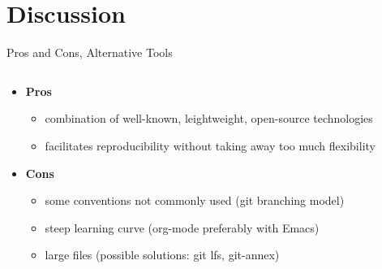 \documentclass[10pt,aspectratio=169]{beamer}
\begin{document}
\section{Discussion}
\begin{frame}{Pros and Cons, Alternative Tools}
    \begin{columns}[c]
    \begin{column}{.5\textwidth} %
    \begin{minipage}{1\textwidth}
    \begin{itemize}
        \item \textbf{Pros}
        \begin{itemize}
            \item combination of well-known, leightweight, open-source technologies
            \item facilitates reproducibility without taking away too much flexibility
        \end{itemize}
        \item \textbf{Cons}
        \begin{itemize}
            \item some conventions not commonly used (git branching model)
            \item steep learning curve (org-mode preferably with Emacs)
            \item large files (possible solutions: git lfs, git-annex)
        \end{itemize}
    \end{itemize}
    \end{minipage}
    \end{column}
    \begin{column}{.5\textwidth} %
    \end{column}
    \end{columns}
\end{frame}
\end{document}
